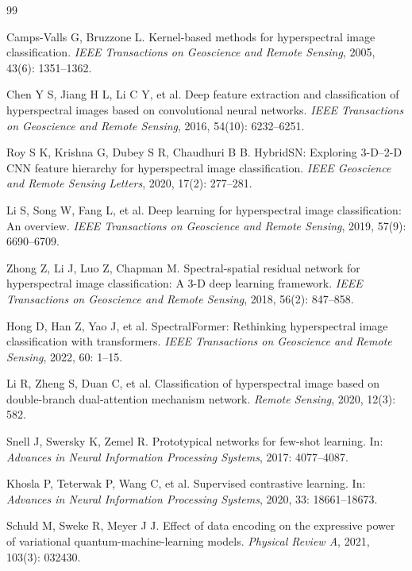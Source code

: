 \documentclass[UTF8,a4paper,zihao=-4,fontset=fandol]{ctexart}
\begin{document}
\begin{thebibliography}{99}

Camps-Valls G, Bruzzone L. Kernel-based methods for hyperspectral image classification. \textit{IEEE Transactions on Geoscience and Remote Sensing}, 2005, 43(6): 1351--1362.

Chen Y S, Jiang H L, Li C Y, et al. Deep feature extraction and classification of hyperspectral images based on convolutional neural networks. \textit{IEEE Transactions on Geoscience and Remote Sensing}, 2016, 54(10): 6232--6251.

Roy S K, Krishna G, Dubey S R, Chaudhuri B B. HybridSN: Exploring 3-D--2-D CNN feature hierarchy for hyperspectral image classification. \textit{IEEE Geoscience and Remote Sensing Letters}, 2020, 17(2): 277--281.

Li S, Song W, Fang L, et al. Deep learning for hyperspectral image classification: An overview. \textit{IEEE Transactions on Geoscience and Remote Sensing}, 2019, 57(9): 6690--6709.

Zhong Z, Li J, Luo Z, Chapman M. Spectral-spatial residual network for hyperspectral image classification: A 3-D deep learning framework. \textit{IEEE Transactions on Geoscience and Remote Sensing}, 2018, 56(2): 847--858.

Hong D, Han Z, Yao J, et al. SpectralFormer: Rethinking hyperspectral image classification with transformers. \textit{IEEE Transactions on Geoscience and Remote Sensing}, 2022, 60: 1--15.

Li R, Zheng S, Duan C, et al. Classification of hyperspectral image based on double-branch dual-attention mechanism network. \textit{Remote Sensing}, 2020, 12(3): 582.

Snell J, Swersky K, Zemel R. Prototypical networks for few-shot learning. In: \textit{Advances in Neural Information Processing Systems}, 2017: 4077--4087.

Khosla P, Teterwak P, Wang C, et al. Supervised contrastive learning. In: \textit{Advances in Neural Information Processing Systems}, 2020, 33: 18661--18673.

Schuld M, Sweke R, Meyer J J. Effect of data encoding on the expressive power of variational quantum-machine-learning models. \textit{Physical Review A}, 2021, 103(3): 032430.


\end{thebibliography}
\end{document}
